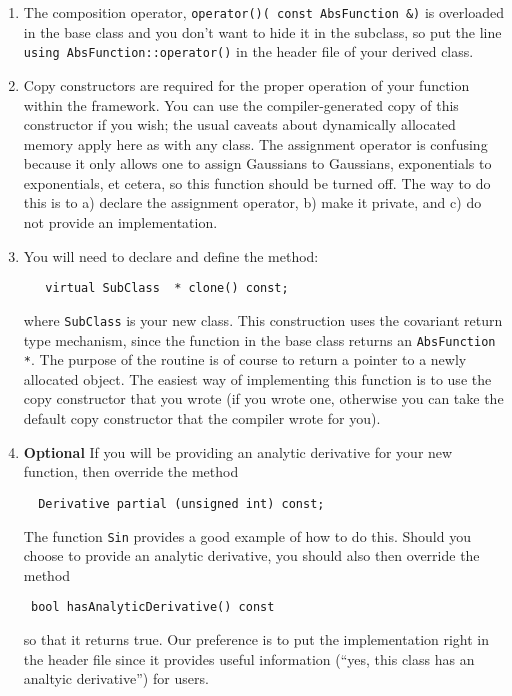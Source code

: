 \documentclass{report}
\begin{document}
\begin{enumerate}
\item { The composition operator, \verb#operator()( const AbsFunction &)# is 
overloaded in the base class and you don't want to hide it in the subclass,
so put the line \verb#using AbsFunction::operator()# in the header file
of your derived class.}

\item {Copy constructors are required for the proper operation of your
function within the framework.  You can use the compiler-generated
copy of this constructor if you wish; the usual caveats about
dynamically allocated memory apply here as with any class.  The
assignment operator is confusing because it only allows one to assign
Gaussians to Gaussians, exponentials to exponentials, et cetera, so
this function should be turned off.  The way to do this is to a)
declare the assignment operator, b) make it private, and c) do not
provide an implementation.}


\item {You will need to declare and define the method:
\begin{verbatim}
   virtual SubClass  * clone() const;
\end{verbatim}
where \verb#SubClass# is your new class.  This construction uses the
covariant return type mechanism, since the function in the base class
returns an \verb#AbsFunction *#.  The purpose of the routine is of course to
return a pointer to a newly allocated object.  The easiest way of
implementing this function is to use the copy constructor that you
wrote (if you wrote one, otherwise you can take the default copy
constructor that the compiler wrote for you).}

\item {{\bf Optional} If you will be providing an analytic derivative for your
new function, then override the method
\begin{verbatim}	
  Derivative partial (unsigned int) const;	
\end{verbatim}

The function \verb+Sin+ provides a good example of how to do this.  Should you
choose to provide an analytic derivative, you should also then override the
method
\begin{verbatim}
 bool hasAnalyticDerivative() const 
\end{verbatim}
so that it returns true.  Our preference is to put the implementation right in
the header file since it provides useful information (``yes, this class has an
analtyic derivative'') for users. }
\end{enumerate}
\end{document}
